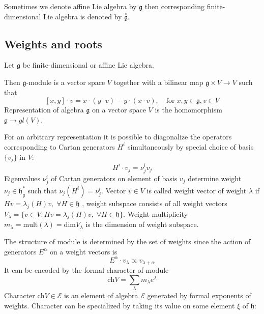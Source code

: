 \documentclass[preprint,12pt]{elsarticle}
\newcommand{\go}{\stackrel{\circ }{\mathfrak{g}}}
\newcommand{\gf}{\mathfrak{g}}
\newcommand{\hf}{\mathfrak{h}}
\newcommand{\hfg}{\hf_{\gf}}
\begin{document}
Sometimes we denote affine Lie algebra by $\gf$ then corresponding finite-dimensional Lie algebra is denoted by $\go$. 

\subsection{Weights and roots}
\label{sec:weights-roots}

Let $\gf$ be finite-dimensional or affine Lie algebra. 

Then $\gf$-module is a vector space $V$ together with a bilinear map $\gf \times V\to V$ such that
\begin{equation}
  \label{eq:2}
  [x,y]\cdot v = x\cdot(y\cdot v) - y\cdot(x\cdot v), \quad \mbox{for}\; x,y\in \gf, v\in V
\end{equation}
Representation of algebra $\gf$ on a vector space $V$ is the homomorphism $\gf\to gl(V)$. 

For an arbitrary representation it is possible to diagonalize the operators corresponding to Cartan generators $H^{i}$ simultaneously by special choice of basis $\{v_{j}\}$ in $V$:
\begin{equation}
  \label{eq:3}
  H^{i}\cdot v_{j}=\nu_{j}^{i}v_{j}
\end{equation}
Eigenvalues $\nu^{i}_{j}$ of Cartan generators on element of basis $v_{j}$ determine weight $\nu_{j}\in \hfg^{*}$ such that $\nu_{j}(H^{i})=\nu_{j}^{i}$. Vector $v\in V$ is called weight vector of weight $\lambda$ if $H v=\lambda_{j}(H)v,\; \forall H\in \hf$ , weight subspace consists of all weight vectors $V_{\lambda}=\{v\in V: H v=\lambda_{j}(H)v,\; \forall H\in \hf\}$. Weight multiplicity $m_{\lambda}=\mathrm{mult}(\lambda)=\mathrm{dim} V_{\lambda}$ is the dimension of weight subspace.

The structure of module is determined by the set of weights since the action of generators $E^{\alpha}$ on a weight vectors is
\begin{equation}
  \label{eq:5}
  E^{\alpha}\cdot v_{\lambda} \propto v_{\lambda+\alpha}
\end{equation}
It can be encoded by the formal character of module
\begin{equation}
  \label{eq:10}
  \mathrm{ch}V=\sum_{\lambda}m_{\lambda} e^{\lambda}
\end{equation}
Character  $\mathrm{ch}V\in \mathcal{E}$ is an element of algebra $\mathcal{E}$ generated by formal exponents of weights.
Character can be specialized by taking its value on some element $\xi$ of $\hf$:
\end{document}
